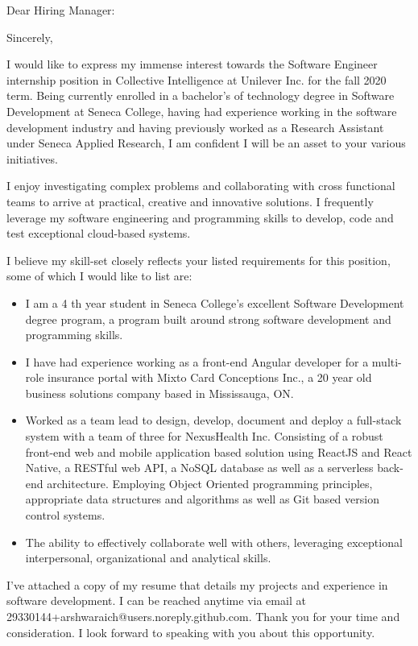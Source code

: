 \documentclass[letterpaper]{moderncv}
\begin{document}
\date{\today}
\opening{Dear Hiring Manager:}
\closing{Sincerely,}
\makelettertitle

I would like to express my immense interest towards the Software Engineer internship position in Collective Intelligence at Unilever Inc. for the fall 2020 term. Being currently enrolled in a bachelor’s of technology degree in Software Development at Seneca College, having had experience working in the software development industry and having previously worked as a Research Assistant under Seneca Applied Research, I am confident I will be an asset to your various initiatives.

I enjoy investigating complex problems and collaborating with cross functional teams to arrive at practical, creative and innovative solutions. I frequently leverage my software engineering and programming skills to develop, code and test exceptional cloud-based systems.

I believe my skill-set closely reflects your listed requirements for this position, some of which I would like to list are:

{\begin{itemize}%
	\item I am a 4 th year student in Seneca College’s excellent Software Development degree program, a program built around strong software development and programming skills.
	\item I have had experience working as a front-end Angular developer for a multi-role insurance portal with Mixto Card Conceptions Inc., a 20 year old business solutions company based in Mississauga, ON.
	\item Worked as a team lead to design, develop, document and deploy a full-stack system with a team of three for NexusHealth Inc. Consisting of a robust front-end web and mobile application based solution using ReactJS and React Native, a RESTful web API, a NoSQL database as well as a serverless back-end architecture. Employing Object Oriented programming principles, appropriate data structures and algorithms as well as Git based version control systems.
	\item The ability to effectively collaborate well with others, leveraging exceptional interpersonal, organizational and analytical skills.
	\end{itemize}}
	
I’ve attached a copy of my resume that details my projects and experience in software development. I can be reached anytime via email at 29330144+arshwaraich@users.noreply.github.com. Thank you for your time and consideration. I look forward to speaking with you about this opportunity.

\makeletterclosing
\end{document}
